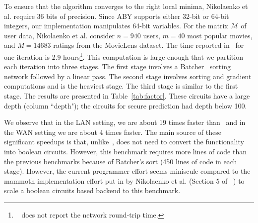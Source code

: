 To ensure that the algorithm converges to the right local minima, Nikolaenko et al. require
36 bits of precision. Since ABY supports either 32-bit or 64-bit integers, our \tool implementation
manipulates 64-bit variables. For the matrix $\mathcal{M}$ of  user data, Nikolaenko et al. consider $n=940$ users, $m=40$ most popular movies, and $M=14683$ ratings from the MovieLens dataset. The time reported in~\cite{valeriaMatrix}
for one iteration is 2.9 hours\footnote{~\cite{valeriaMatrix} does not report the network round-trip time.}. This computation is large enough that we partition each iteration
into three stages. The first stage involves a Batcher~\cite{Batcher} sorting network followed by a linear pass.
The second stage involves sorting and gradient computations and is the heaviest stage.
The third  stage is similar to the first stage. The results are presented in Table~\ref{tab:factor}. These circuits have a large depth (column ``depth"); the circuits for secure prediction had depth below 100.


We observe that in the LAN setting, we are about 19 times faster than~\cite{valeriaMatrix} and in the WAN
setting we are about 4 times faster. The main source of these significant speedups is that, unlike~\cite{valeriaMatrix}, \tool does not need to convert the functionality into boolean circuits. 
However, this benchmark requires more lines of code than the previous benchmarks
because of  Batcher's sort (450 lines of \tool code in each stage).
However, the current programmer effort seems miniscule compared to the mammoth implementation effort
put in by Nikolaenko et al. (Section 5 of ~\cite{valeriaMatrix}) to scale a boolean circuits based
backend to this benchmark.


